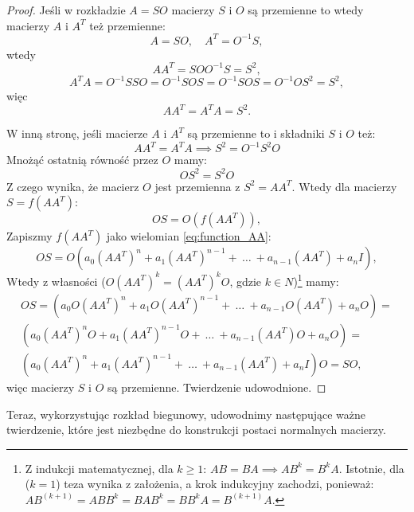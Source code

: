 \begin{proof}
    Jeśli w rozkładzie $A = SO$ macierzy $S$ i $O$ są przemienne to wtedy macierzy $A$ i $A^T$ też przemienne:
    $$ A = SO, \quad A^T = O^{-1}S, $$
    wtedy
    $$ AA^T = SOO^{-1}S = S^2, $$ 
    $$ A^TA = O^{-1}SSO = O^{-1}SOS = O^{-1}SOS = O^{-1}OS^2 = S^2,$$
    więc
    $$AA^T = A^TA = S^2.$$
    
    W inną stronę, jeśli macierze $A$ i $A^T$ są przemienne to i składniki $S$ i $O$ też:
    $$ AA^T = A^TA \implies S^2 = O^{-1}S^2O $$
    Mnożąć ostatnią równość przez $O$ mamy:
    $$ OS^2 = S^2O $$
    Z czego wynika, że macierz $O$ jest przemienna z $S^2 = AA^T$.
    Wtedy dla macierzy $S = f(AA^T)$:
    $$OS = O(f(AA^T)),$$
    Zapiszmy $f(AA^T)$ jako wielomian \eqref{eq:function_AA}:
    $$OS = O(a_0(AA^T)^n + a_1(AA^T)^{n - 1} + \ \ldots  \ + a_{n - 1}(AA^T) + a_{n}I),$$
    Wtedy z własności ($O(AA^T)^k = (AA^T)^kO$, gdzie $k \in N$)\footnote{Z indukcji matematycznej, dla $k \ge 1$: $AB = BA \implies AB^k = B^kA$. Istotnie, dla ($k=1$) teza wynika z założenia, a krok indukcyjny zachodzi, ponieważ: $AB^{(k+1)} = ABB^k = BAB^k = BB^kA = B^{(k+1)}A$.} mamy:
    \[
    \begin{aligned}
    OS = (a_0O(AA^T)^n + a_1O(AA^T)^{n - 1} + \ \ldots  \ + a_{n - 1}O(AA^T) + a_{n}O) = \\ (a_0(AA^T)^nO + a_1(AA^T)^{n - 1}O + \ \ldots  \ + a_{n - 1}(AA^T)O + a_{n}O) = \\ (a_0(AA^T)^n + a_1(AA^T)^{n - 1} + \ \ldots  \ + a_{n - 1}(AA^T) + a_{n}I)O = SO,
    \end{aligned}
    \]
    więc macierzy $S$ i $O$ są przemienne. Twierdzenie udowodnione.

\end{proof}

Teraz, wykorzystując rozkład biegunowy, udowodnimy następujące ważne twierdzenie, które jest niezbędne do konstrukcji postaci normalnych macierzy.

